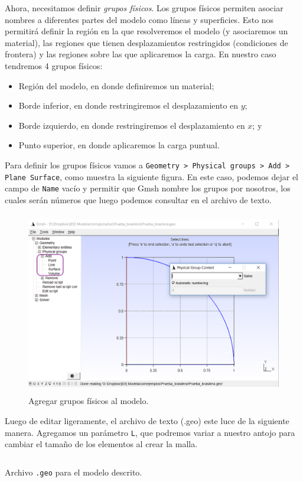 \documentclass[12pt,letterpaper]{article}
\begin{document}
Ahora, necesitamos definir \emph{grupos físicos}. Los grupos físicos permiten asociar nombres a diferentes partes del modelo como líneas y superficies. Esto nos permitirá definir la región en la que resolveremos el modelo (y asociaremos un material), las regiones que tienen desplazamientos restringidos (condiciones de frontera) y las regiones sobre las que aplicaremos la carga. En nuestro caso tendremos 4 grupos físicos:
\begin{itemize}
  \item Región del modelo, en donde definiremos un material;
  \item Borde inferior, en donde restringiremos el desplazamiento en $y$;
  \item Borde izquierdo, en donde restringiremos el desplazamiento en $x$; y
  \item Punto superior, en donde aplicaremos la carga puntual.
\end{itemize}

Para definir los grupos físicos vamos a  \texttt{Geometry > Physical groups > Add > Plane Surface}, como muestra la siguiente figura. En este caso, podemos dejar el campo de \texttt{Name} vacío y permitir que Gmsh nombre los grupos por nosotros, los cuales serán números que luego podemos consultar en el archivo de texto.
\begin{figure}[H]
    \centering
    \includegraphics[height=8cm]{img/Agregar_linea_fisica.png} 
    \caption{Agregar grupos físicos al modelo.}
\end{figure}

Luego de editar ligeramente, el archivo de texto (.geo) este luce de la siguiente manera. Agregamos un parámetro \texttt{L}, que podremos variar a nuestro antojo para cambiar el tamaño de los elementos al crear la malla.
\begin{listing}[H]
    \inputminted[mathescape,
               linenos,
               numbersep=5pt,
               gobble=0,
               frame=lines,
               framesep=2mm]{c}{Prueba_brasilera.geo}
    \caption{Archivo \texttt{.geo} para el modelo descrito.}
    \label{lst:geo}
\end{listing}
\end{document}
